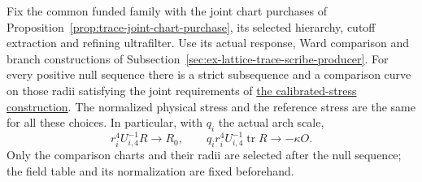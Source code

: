 \begin{proposition}
\label{prop:c14-joint-calibrated-curve}
Fix the common funded family with the joint chart purchases of
Proposition~\ref{prop:trace-joint-chart-purchase}, its selected hierarchy,
cutoff extraction and refining ultrafilter. Use its actual response,
Ward comparison and branch constructions of
Subsection~\ref{sec:ex-lattice-trace-scribe-producer}. For every positive
null sequence there is a strict subsequence and a comparison curve on
those radii satisfying the joint requirements of
\hyperref[par:ex-trace-joint-curve]{the calibrated-stress construction}.
The normalized physical stress and the reference stress are the same
for all these choices. In particular, with $q_i$ the actual arch scale,
\[
 r_i^4U_{i,4}^{-1}R\longrightarrow R_0,
 \qquad q_i r_i^4U_{i,4}^{-1}\operatorname{tr}R
                         \longrightarrow-\kappa O.
\]
Only the comparison charts and their radii are selected after the null
sequence; the field table and its normalization are fixed beforehand.
\end{proposition}
